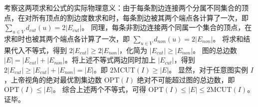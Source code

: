 \documentclass{ctexart}
\begin{document}
\begin{enumerate}[label=\arabic*.]
        考察这两项求和公式的实际物理意义：由于每条割边连接两个分属不同集合的顶点，在对所有顶点的割边度数求和时，每条割边被其两个端点各计算了一次，即 $\sum_{u \in V} d_{cut}(u) = 2|E_{cut}|$。
        同理，每条非割边连接两个同属一个集合的顶点，在求和时也被其两个端点各计算了一次，即 $\sum_{u \in V} d_{non}(u) = 2|E_{non}|$。
        将求和结果代入不等式，得到 $2|E_{cut}| \ge 2|E_{non}|$，化简为 $|E_{cut}| \ge |E_{non}|$。
        图的总边数 $|E| = |E_{cut}| + |E_{non}|$。将上述不等式两边同时加上 $|E_{cut}|$，得到 $2|E_{cut}| \ge |E_{cut}| + |E_{non}| = |E|$。即 $2\text{MCUT}(I) \ge |E|$。
        显然，对于任意图实例 $I$，上帝视角的绝对最优割集边数 $\text{OPT}(I)$ 绝对不可能超过图的总边数，即 $\text{OPT}(I) \le |E|$。
        综合上述两个不等式，可得 $\text{OPT}(I) \le |E| \le 2\text{MCUT}(I)$。证毕。
\end{enumerate}
\end{document}
